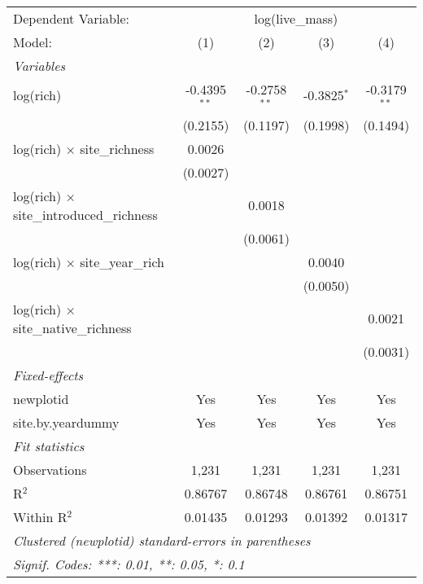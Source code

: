 \begin{tabular}{lcccc}
\tabularnewline\midrule\midrule
Dependent Variable:&\multicolumn{4}{c}{log(live\_mass)}\\
Model:&(1) & (2) & (3) & (4)\\
\midrule \emph{Variables}&   &   &   &  \\
log(rich) & -0.4395$^{**}$ & -0.2758$^{**}$ & -0.3825$^{*}$ & -0.3179$^{**}$\\
  &(0.2155) & (0.1197) & (0.1998) & (0.1494)\\
log(rich) $\times $ site\_richness & 0.0026 &    &    &   \\
  &(0.0027) &    &    &   \\
log(rich) $\times $ site\_introduced\_richness &    & 0.0018 &    &   \\
  &   & (0.0061) &    &   \\
log(rich) $\times $ site\_year\_rich &    &    & 0.0040 &   \\
  &   &    & (0.0050) &   \\
log(rich) $\times $ site\_native\_richness &    &    &    & 0.0021\\
  &   &    &    & (0.0031)\\
\midrule \emph{Fixed-effects}&   &   &   &  \\
newplotid & Yes & Yes & Yes & Yes\\
site.by.yeardummy & Yes & Yes & Yes & Yes\\
\midrule \emph{Fit statistics}&  & & & \\
Observations & 1,231&1,231&1,231&1,231\\
R$^2$ & 0.86767&0.86748&0.86761&0.86751\\
Within R$^2$ & 0.01435&0.01293&0.01392&0.01317\\
\midrule\midrule\multicolumn{5}{l}{\emph{Clustered (newplotid) standard-errors in parentheses}}\\
\multicolumn{5}{l}{\emph{Signif. Codes: ***: 0.01, **: 0.05, *: 0.1}}\\
\end{tabular}


